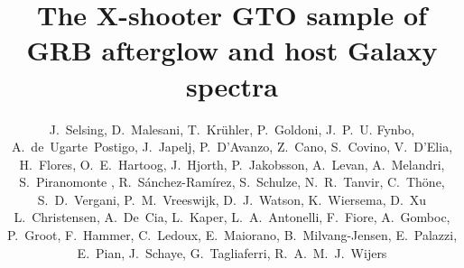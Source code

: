 \documentclass[iop, twocolappendix, numberedappendix, tighten, appendixfloats]{emulateapj}
\begin{document}
	
	\title{\vspace{-0.5cm}The X-shooter GTO sample of GRB afterglow and host Galaxy spectra}
	
	\author{
		J.~Selsing, 
		D.~Malesani, 
		T.~Kr\"{u}hler, 
		P.~Goldoni, 
		J.~P.~U. Fynbo, 
		A.~de~Ugarte~Postigo, 
		J.~Japelj,
		P.~D'Avanzo,
		Z.~Cano,
		S.~Covino, 
		V.~D'Elia, 
		H.~Flores,
		O.~E.~Hartoog,
		J.~Hjorth, 
		P.~Jakobsson, 
		A.~Levan,
		A.~Melandri,
		S.~Piranomonte ,
		R.~S\'anchez-Ram\'irez,
		S.~Schulze, 
		N.~R.~Tanvir,
		C.~Th{\"o}ne,
		S.~D.~Vergani,
		P.~M.~Vreeswijk, 
		D.~J.~Watson,
		K.~Wiersema,
		D.~Xu
		L.~Christensen,
		A.~De~Cia, 
		L.~Kaper, 
		L.~A.~Antonelli,
		F.~Fiore,
		A.~Gomboc,
		P.~Groot,
		F.~Hammer,
		C.~Ledoux, 
		E.~Maiorano,
		B.~Milvang-Jensen, 
		E.~Palazzi,
		E.~Pian,
		J.~Schaye,
		G.~Tagliaferri,
		R.~A.~M.~J.~Wijers
	}
	
\end{document}
